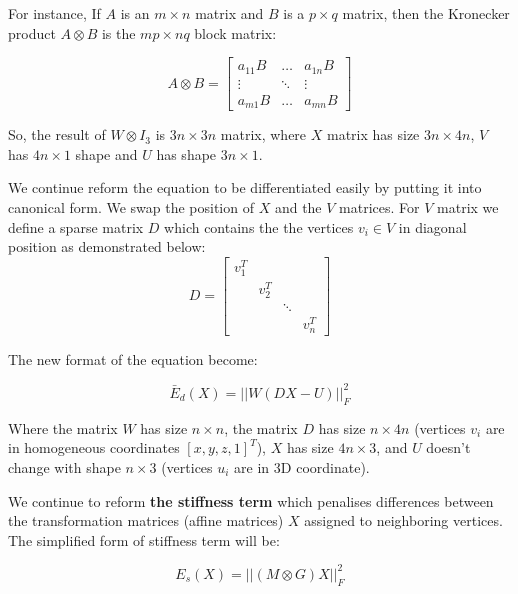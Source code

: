 \documentclass[../structure.tex]{subfiles}
\begin{document}
For instance, If $A$ is an $m \times n$ matrix and $B$ is a $p \times q$ matrix, then the Kronecker product $A \otimes B$ is the $mp \times nq$ block matrix:

\begin{equation*}
A \otimes B =
\begin{bmatrix}
a_{11}B & \dots  & a_{1n}B \\
\vdots  & \ddots & \vdots  \\
a_{m1}B & \dots  & a_{mn}B
\end{bmatrix}
\end{equation*}

So, the result of $W \otimes I_{3}$ is $3n\times 3n$ matrix, where $X$ matrix has size $3n\times4n$, $V$ has $4n\times1$ shape and $U$ has shape $3n\times1$.

We continue reform the equation to be differentiated easily by putting it into canonical form. We swap the position of $X$ and the $V$ matrices. For $V$ matrix we define a sparse matrix $D$ which contains the the vertices $v_{i} \in V$ in diagonal position as demonstrated below:
\begin{equation}
D =
\begin{bmatrix}
v_{1}^T & & & \\
& v_{2}^T & & \\
& & \ddots & \\
& & & v_{n}^T
\end{bmatrix}
\end{equation}

The new format of the equation become:

\begin{equation}
\bar{E}_{d}(X) = ||W(DX-U)||_{F}^2
\end{equation}

Where the matrix $W$ has size $n\times n$, the matrix $D$ has size $n\times 4n$ (vertices $v_{i}$ are in homogeneous coordinates $[x,y,z,1]^T$), $X$ has size $4n\times 3$, and $U$ doesn't change with shape $n\times 3$ (vertices $u_{i}$ are in 3D coordinate).

We continue to reform \textbf{the stiffness term} which penalises differences between the transformation matrices (affine matrices) $X$ assigned to neighboring vertices. The simplified form of stiffness term will be:

\begin{equation}
E_{s}(X) = ||(M\otimes G)X||_{F}^2
\end{equation}
\end{document}
